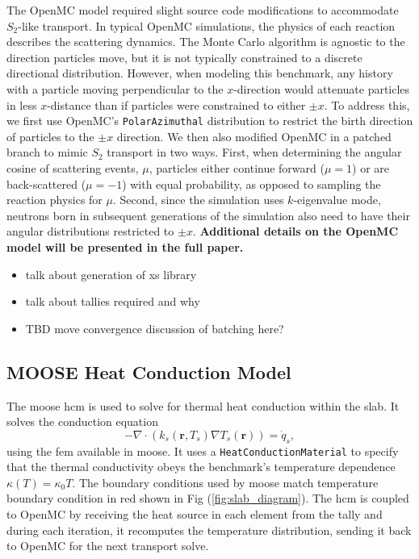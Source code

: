 \documentclass[letterpaper]{mc2023}
\begin{document}
The OpenMC model required slight source code modifications to accommodate $S_2$-like transport. In typical OpenMC simulations,
the physics of each reaction describes the scattering dynamics. The Monte Carlo algorithm is agnostic to the direction
particles move, but it is not typically constrained to a discrete directional distribution. However, when modeling this
benchmark, any history with a particle moving perpendicular to the $x$-direction would attenuate particles in less
$x$-distance than if particles were constrained to either $\pm x$. To address this, we first use OpenMC's \texttt{PolarAzimuthal}
distribution to restrict the birth direction of particles to the $\pm x$ direction. We then also modified OpenMC in a
patched branch to mimic $S_{2}$ transport in two ways. First, when determining the angular cosine of scattering events,
$\mu$, particles either continue forward ($\mu=1$) or are back-scattered ($\mu=-1$) with equal probability, as opposed to
sampling the reaction physics for $\mu$. Second, since the simulation uses $k$-eigenvalue mode, neutrons born in subsequent
generations of the simulation also need to have their angular distributions restricted to $\pm x$. \textbf{Additional details on
the OpenMC model will be presented in the full paper.}
\begin{itemize}
    \item talk about generation of xs library
    \item talk about tallies required and why
    \item TBD move convergence discussion of batching here?
\end{itemize}

\subsection{MOOSE Heat Conduction Model}
The \gls{moose} \gls{hcm} is used to solve for thermal heat conduction within the slab. It solves the conduction equation
\begin{equation}\label{eq:conduction}
    - \nabla \cdot (k_{s}(\mathbf{r},T_{s}) \nabla T_{s}(\mathbf{r})) = \dot{q}_{s},
\end{equation}
using the \gls{fem} available in \gls{moose}. It uses a \texttt{HeatConductionMaterial} to specify that the thermal conductivity
obeys the benchmark's temperature dependence $\kappa(T)=\kappa_{0}T$. The boundary conditions used by \gls{moose} match temperature
boundary condition in red shown in Fig (\ref{fig:slab_diagram}). The \gls{hcm} is coupled to OpenMC by receiving the heat source in
each element from the tally and during each iteration, it recomputes the temperature distribution, sending it back to OpenMC for the
next transport solve.
\end{document}
